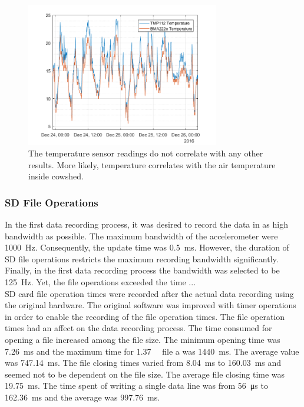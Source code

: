 \documentclass[english,12pt,a4paper,pdftex,elec,utf8]{aaltothesis}
\begin{document}
\begin{figure}[htb]
\centering
\includegraphics[width = 0.75\textwidth]{figures/lehma9885temperature.png}
\caption{The temperature sensor readings do not correlate with any other results. More likely, temperature correlates with the air temperature inside cowshed.} \label{cowtemperature}
\end{figure}





\subsubsection{SD File Operations}

In the first data recording process, it was desired to record the data in as high bandwidth as possible. The maximum bandwidth of the accelerometer were \SI{1000}{\hertz}. Consequently, the update time was \SI{0.5}{\milli \second}. However, the duration of SD file operations restricts the maximum recording bandwidth significantly. Finally, in the first data recording process the bandwidth was selected to be \SI{125}{\hertz}. Yet, the file operations exceeded the time ... \\

SD card file operation times were recorded after the actual data recording using the original hardware. The original software was improved with timer operations in order to enable the recording of the file operation times. The file operation times had an affect on the data recording process. The time consumed for opening a file increased among the file size. The minimum opening time was \SI{7.26}{\milli\second} and the maximum time for \SI{1.37}{\giga \byte} file a was \SI{1440}{\milli \second}. The average value was \SI{747.14}{\milli \second}. The file closing times varied from \SI{8.04}{\milli \second} to \SI{160.03}{\milli \second} and seemed not to be dependent on the file size. The average file closing time was \SI{19.75}{\milli \second}. The time spent of writing a single data line was from \SI{56}{\micro \second} to \SI{162.36}{\milli\second} and the average was \SI{997.76}{\milli\second}. \\
\end{document}
